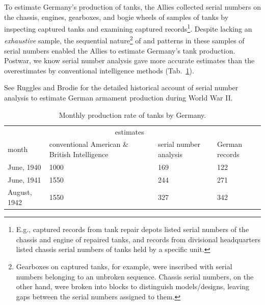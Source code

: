 \documentclass[11pt, oneside]{article}
\begin{document}
To estimate Germany's production of tanks, the Allies collected serial numbers on the chassis, engines, gearboxes, and bogie wheels of samples of tanks by inspecting captured tanks and examining captured records\footnote{E.g., captured records from tank repair depots listed serial numbers of the chassis and engine of repaired tanks, and records from divisional headquarters listed chassis serial numbers of tanks held by a specific unit.}. 
Despite lacking an \emph{exhaustive} sample, the sequential nature\footnote{
Gearboxes on captured tanks, for example, were inscribed with serial numbers belonging to an unbroken sequence. Chassis serial numbers, on the other hand, were broken into blocks to distinguish models/designs, leaving gaps between the serial numbers assigned to them.
} of and patterns in these samples of serial numbers enabled the Allies to estimate Germany's tank production. Postwar, we know serial number analysis gave more accurate estimates than the overestimates by conventional intelligence methods (Tab.~\ref{tab:success}).

See Ruggles and Brodie \cite{ruggles1947empirical} for the detailed historical account of serial number analysis to estimate German armament production during World War II.


\begin{table}[h!]
\centering 
\caption{Monthly production rate of tanks by Germany. \cite{ruggles1947empirical}} \label{tab:success}
\begin{tabular}{p{2.5cm} p{4cm} p{4cm} p{2cm}}
\toprule
 & \multicolumn{2}{c}{estimates} &   \\ 
\cmidrule(r){2-3}
month & conventional American \& British Intelligence & serial number analysis  & German records \\
\midrule
June, 1940 & 1000& 169 &  122 \\
June, 1941 &1550 & 244 &   271 \\
August, 1942 & 1550& 327  & 342 \\
\bottomrule
\end{tabular}
\end{table}
\end{document}
